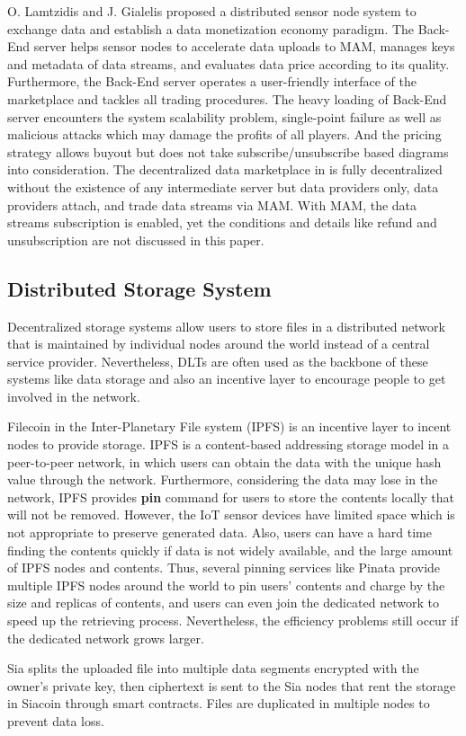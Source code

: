 \begin{spacing}{2.0}
O. Lamtzidis and J. Gialelis \cite{IOTASensorNode} proposed a distributed sensor node system to exchange data and establish a data monetization economy paradigm. The Back-End server helps sensor nodes to accelerate data uploads to MAM, manages keys and metadata of data streams, and evaluates data price according to its quality. Furthermore, the Back-End server operates a user-friendly interface of the marketplace and tackles all trading procedures. The heavy loading of Back-End server encounters the system scalability problem, single-point failure as well as malicious attacks which may damage the profits of all players. And the pricing strategy allows buyout but does not take subscribe/unsubscribe based diagrams into consideration. The decentralized data marketplace in \cite{DDMSmartCities} is fully decentralized without the existence of any intermediate server but data providers only, data providers attach, and trade data streams via MAM. With MAM, the data streams subscription is enabled, yet the conditions and details like refund and unsubscription are not discussed in this paper.
 
\subsection{Distributed Storage System}
\label{section:distributed_storage}
Decentralized storage systems allow users to store files in a distributed network that is maintained by individual nodes around the world instead of a central service provider. Nevertheless, DLTs are often used as the backbone of these systems like data storage and also an incentive layer to encourage people to get involved in the network.

Filecoin \cite{FileCoin} in the Inter-Planetary File system (IPFS) is an incentive layer to incent nodes to provide storage. IPFS is a content-based addressing storage model in a peer-to-peer network, in which users can obtain the data with the unique hash value through the network. Furthermore, considering the data may lose in the network, IPFS provides \textbf{pin} command for users to store the contents locally that will not be removed. However, the IoT sensor devices have limited space which is not appropriate to preserve generated data. Also, users can have a hard time finding the contents quickly if data is not widely available, and the large amount of IPFS nodes and contents. Thus, several pinning services like Pinata provide multiple IPFS nodes around the world to pin users' contents and charge by the size and replicas of contents, and users can even join the dedicated network to speed up the retrieving process. Nevertheless, the efficiency problems still occur if the dedicated network grows larger.

Sia\cite{Sia} splits the uploaded file into multiple data segments encrypted with the owner's private key, then ciphertext is sent to the Sia nodes that rent the storage in Siacoin through smart contracts. Files are duplicated in multiple nodes to prevent data loss.

\end{spacing}


